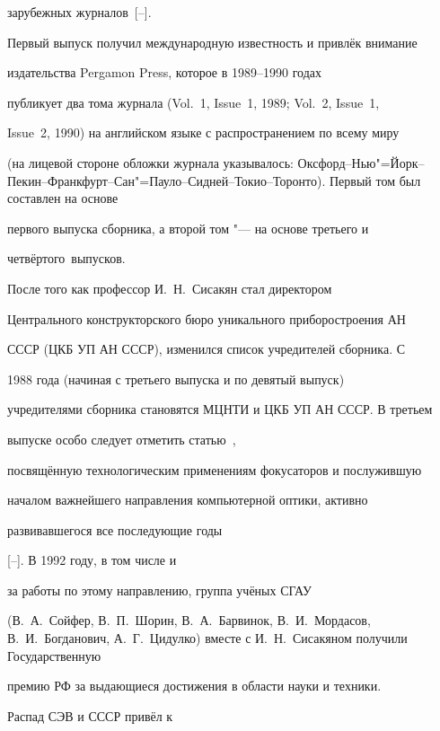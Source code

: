 зарубежных \mbox{журналов~[--].}



Первый выпуск получил международную известность и привлёк внимание

издательства Pergamon Press, которое в 1989--1990 годах

публикует два тома журнала (Vol.~1, Issue~1, 1989; Vol.~2, Issue~1,

Issue~2, 1990) на английском языке с распространением по всему миру

(на лицевой стороне обложки журнала указывалось: Оксфорд--Нью"=Йорк--Пекин--Франкфурт--Сан"=Пауло--Сидней--Токио--Торонто). Первый том был составлен на основе

первого выпуска сборника, а второй том "--- на основе третьего и

\mbox{четвёртого выпусков.}



После того как профессор И.~Н.~Сисакян стал директором

Центрального конструкторского бюро уникального приборостроения АН

СССР (ЦКБ УП АН СССР), изменился список учредителей сборника. С

1988 года (начиная с третьего выпуска и по девятый выпуск)

учредителями сборника становятся МЦНТИ и ЦКБ УП АН СССР. В третьем

выпуске особо следует отметить статью~\cite{kol:bib66},

посвящённую технологическим применениям фокусаторов и послужившую

началом важнейшего направления компьютерной оптики, активно

развивавшегося все последующие годы

[--]. В 1992 году, в том числе и

за работы по этому направлению, группа учёных СГАУ 

(В.~А.~Сойфер, В.~П.~Шорин, В.~А.~Барвинок, В.~И.~Мордасов, В.~И.~Богданович, А.~Г.~Цидулко) вместе с И.~Н.~Сисакяном получили Государственную

премию РФ за выдающиеся достижения в области науки и техники.



\smallskip



 Распад СЭВ и СССР привёл к

